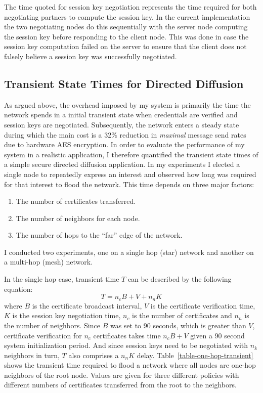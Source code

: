 The time quoted for session key negotiation represents the time required for both negotiating
partners to compute the session key. In the current implementation the two negotiating nodes do
this sequentially with the server node computing the session key before responding to the client
node. This was done in case the session key computation failed on the server to ensure that the
client does not falsely believe a session key was successfully negotiated.

\subsection{Transient State Times for Directed Diffusion}

As argued above, the overhead imposed by my system is primarily the time the network spends in a
initial transient state when credentials are verified and session keys are negotiated.
Subsequently, the network enters a steady state during which the main cost is a 32\% reduction
in \emph{maximal} message send rates due to hardware AES encryption. In order to evaluate the
performance of my system in a realistic application, I therefore quantified the transient state
times of a simple secure directed diffusion application. In my experiments I elected a single
node to repeatedly express an interest and observed how long was required for that interest to
flood the network. This time depends on three major factors:
\begin{enumerate}
\item The number of certificates transferred.
\item The number of neighbors for each node.
\item The number of hops to the ``far'' edge of the network.
\end{enumerate}
I conducted two experiments, one on a single hop (star) network and another on a multi-hop
(mesh) network.

In the single hop case, transient time $T$ can be described by the following equation:
\begin{displaymath}
T = n_c B + V + n_n K
\end{displaymath}
where $B$ is the certificate broadcast interval, $V$ is the certificate verification time, $K$
is the session key negotiation time, $n_c$ is the number of certificates and $n_n$ is the number
of neighbors. Since $B$ was set to 90 seconds, which is greater than $V$, certificate
verification for $n_c$ certificates takes time $n_c B + V$ given a 90 second system
initialization period. And since session keys need to be negotiated with $n_k$ neighbors in
turn, $T$ also comprises a $n_nK$ delay. Table~\ref{table-one-hop-transient} shows the transient
time required to flood a network where all nodes are one-hop neighbors of the root node. Values
are given for three different policies with different numbers of certificates transferred from
the root to the neighbors.

